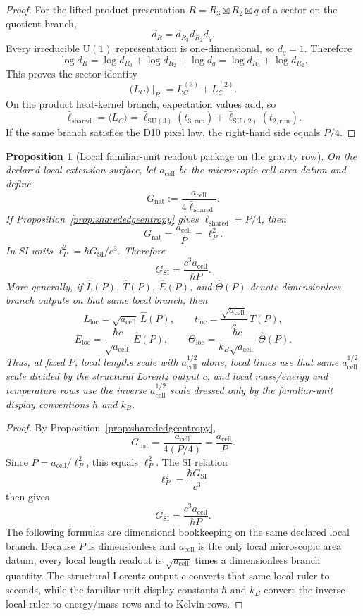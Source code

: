 \documentclass[11pt]{article}
\newtheorem{proposition}[theorem]{Proposition}
\newcommand{\U}{\mathrm{U}}
\newcommand{\ellbar}{\bar{\ell}}
\begin{document}
\begin{proof}
For the lifted product presentation \(R=R_3\boxtimes R_2\boxtimes q\) of a sector on the quotient
branch,
\[
d_R=d_{R_3}d_{R_2}d_q.
\]
Every irreducible \( \U(1) \) representation is one-dimensional, so \(d_q=1\). Therefore
\[
\log d_R
=
\log d_{R_3}+\log d_{R_2}+\log d_q
=
\log d_{R_3}+\log d_{R_2}.
\]
This proves the sector identity
\[
\bigl(L_C\bigr)\!\mid_R=L_C^{(3)}+L_C^{(2)}.
\]
On the product heat-kernel branch, expectation values add, so
\[
\ellbar_{\mathrm{shared}}
=
\langle L_C\rangle
=
\ellbar_{\mathrm{SU(3)}}(t_{3,\mathrm{run}})
+
\ellbar_{\mathrm{SU(2)}}(t_{2,\mathrm{run}}).
\]
If the same branch satisfies the D10 pixel law, the right-hand side equals \(P/4\). \qedhere
\end{proof}

\begin{proposition}[Local familiar-unit readout package on the gravity row]\label{prop:gsi}
On the declared local extension surface, let \(a_{\mathrm{cell}}\) be the microscopic cell-area datum and define
\[
G_{\mathrm{nat}}:=\frac{a_{\mathrm{cell}}}{4\ellbar_{\mathrm{shared}}}.
\]
If Proposition~\ref{prop:sharededgeentropy} gives \(\ellbar_{\mathrm{shared}}=P/4\), then
\[
G_{\mathrm{nat}}=\frac{a_{\mathrm{cell}}}{P}=\ell_P^2.
\]
In SI units \(\ell_P^2=\hbar G_{\mathrm{SI}}/c^3\). Therefore
\[
G_{\mathrm{SI}}
=
\frac{c^3 a_{\mathrm{cell}}}{\hbar P}.
\]
More generally, if \(\widehat L(P)\), \(\widehat T(P)\), \(\widehat E(P)\), and
\(\widehat\Theta(P)\) denote dimensionless branch outputs on that same local branch, then
\[
L_{\mathrm{loc}}=\sqrt{a_{\mathrm{cell}}}\,\widehat L(P),
\qquad
t_{\mathrm{loc}}=\frac{\sqrt{a_{\mathrm{cell}}}}{c}\,\widehat T(P),
\]
\[
E_{\mathrm{loc}}=\frac{\hbar c}{\sqrt{a_{\mathrm{cell}}}}\,\widehat E(P),
\qquad
\Theta_{\mathrm{loc}}=\frac{\hbar c}{k_B\sqrt{a_{\mathrm{cell}}}}\,\widehat\Theta(P).
\]
Thus, at fixed \(P\), local lengths scale with \(a_{\mathrm{cell}}^{1/2}\) alone, local times
use that same \(a_{\mathrm{cell}}^{1/2}\) scale divided by the structural Lorentz output \(c\),
and local mass/energy and temperature rows use the inverse \(a_{\mathrm{cell}}^{1/2}\) scale
dressed only by the familiar-unit display conventions \(\hbar\) and \(k_B\).
\end{proposition}

\begin{proof}
By Proposition~\ref{prop:sharededgeentropy},
\[
G_{\mathrm{nat}}
=
\frac{a_{\mathrm{cell}}}{4(P/4)}
=
\frac{a_{\mathrm{cell}}}{P}.
\]
Since \(P=a_{\mathrm{cell}}/\ell_P^2\), this equals \(\ell_P^2\). The SI relation
\[
\ell_P^2=\frac{\hbar G_{\mathrm{SI}}}{c^3}
\]
then gives
\[
G_{\mathrm{SI}}
=
\frac{c^3 a_{\mathrm{cell}}}{\hbar P}.
\]
The following formulas are dimensional bookkeeping on the same declared local branch. Because \(P\)
is dimensionless and \(a_{\mathrm{cell}}\) is the only local microscopic area datum, every local
length readout is \(\sqrt{a_{\mathrm{cell}}}\) times a dimensionless branch quantity. The structural
Lorentz output \(c\) converts that same local ruler to seconds, while the familiar-unit display
constants \(\hbar\) and \(k_B\) convert the inverse local ruler to energy/mass rows and to Kelvin
rows. \qedhere
\end{proof}
\end{document}
